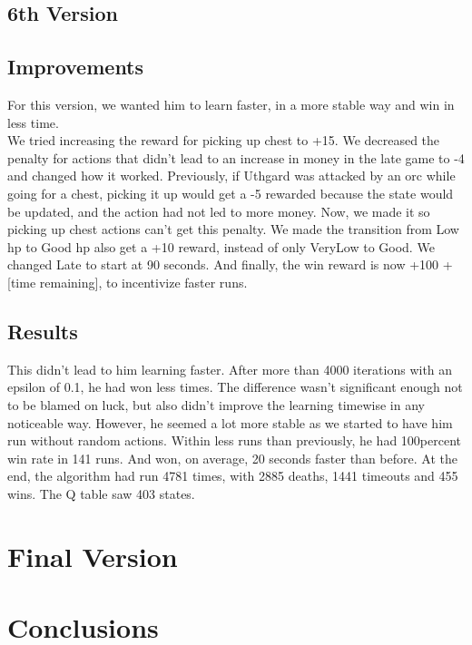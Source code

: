 \documentclass{article}
\begin{document}
  \subsection{6th Version}

  \subsection{Improvements}

  For this version, we wanted him to learn faster, in a more stable way and win in less time.\\
  We tried increasing the reward for picking up chest to +15. We decreased the penalty for actions that didn't lead to an increase in money in the late game to -4 and changed how it worked. Previously, if Uthgard was attacked by an orc while going for a chest, picking it up would get a -5 rewarded because the state would be updated, and the action had not led to more money. 
  Now, we made it so picking up chest actions can't get this penalty. We made the transition from Low hp to Good hp also get a +10 reward, instead of only VeryLow to Good. We changed Late to start at 90 seconds. And finally, the win reward is now +100 + [time remaining], to incentivize faster runs.

  \subsection{Results}

  This didn't lead to him learning faster. After more than 4000 iterations with an epsilon of 0.1, he had won less times. The difference wasn't significant enough not to be blamed on luck, but also didn't improve the learning timewise in any noticeable way.
  However, he seemed a lot more stable as we started to have him run without random actions. Within less runs than previously, he had 100percent win rate in 141 runs. And won, on average, 20 seconds faster than before. At the end, the algorithm had run 4781 times, with 2885 deaths, 1441 timeouts and 455 wins. The Q table saw 403 states.

  \section{Final Version}



  \section{Conclusions}
  
\end{document}
